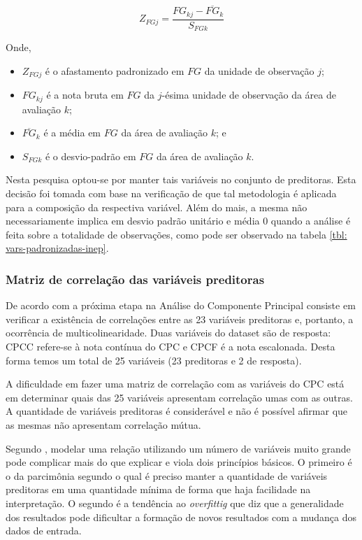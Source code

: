 \begin{equation}
Z_{FGj}=\dfrac{FG_{kj}-\overline{FG}_k}{S_{FGk}}
\end{equation}


Onde,

\begin{itemize}[label={}]
\item $Z_{FGj}$ é o afastamento padronizado em $FG$ da unidade de observação $j$;
\item $FG_{kj}$ é a nota bruta em $FG$ da $j$-ésima unidade de observação da área de avaliação $k$;
\item $\overline{FG}_k$ é a média em $FG$ da área de avaliação $k$; e
\item $S_{FGk}$ é o desvio-padrão em $FG$ da área de avaliação $k$.
\end{itemize}

Nesta pesquisa optou-se por manter tais variáveis no conjunto de preditoras. Esta decisão foi tomada com base na verificação de que tal metodologia é aplicada para a composição da respectiva variável. Além do mais, a mesma não necessariamente implica em desvio padrão unitário e média 0 quando a análise é feita sobre a totalidade de observações, como pode ser observado na tabela \ref{tbl: vars-padronizadas-inep}. 



\subsubsection{Matriz de correlação das variáveis preditoras}

De acordo com  a próxima etapa na Análise do Componente Principal consiste em verificar a existência de correlações entre as 23 variáveis preditoras e, portanto, a ocorrência de multicolinearidade. Duas variáveis do dataset são de resposta: CPCC refere-se à nota contínua do CPC e CPCF é a nota escalonada. Desta forma temos um total de 25 variáveis (23 preditoras e 2 de resposta).

A dificuldade em fazer uma matriz de correlação com as variáveis do CPC está em determinar quais das 25 variáveis apresentam correlação umas com as outras. A quantidade de variáveis preditoras é considerável e não é possível afirmar que as mesmas não apresentam correlação mútua.

Segundo , modelar uma relação utilizando um número de variáveis muito grande pode complicar mais do que explicar e viola dois princípios básicos. O primeiro é o da parcimônia segundo o qual é preciso manter a quantidade de variáveis preditoras em uma quantidade mínima de forma que haja facilidade na interpretação. O segundo é a tendência ao \textit{overfittig} que diz que a generalidade dos resultados pode dificultar a formação de novos resultados com a mudança dos dados de entrada.

